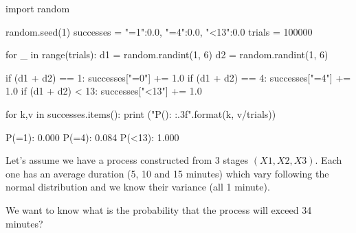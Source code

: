 \cprotEnv\begin{solution}
\begin{ipython}
import random

random.seed(1)
successes = {"=1":0.0, "=4":0.0, "<13":0.0}
trials = 100000

for _ in range(trials):
    d1 = random.randint(1, 6)
    d2 = random.randint(1, 6)

    if (d1 + d2) == 1:
        successes["=0"] += 1.0
    if (d1 + d2) == 4:
        successes["=4"] += 1.0
    if (d1 + d2) < 13:
        successes["<13"] += 1.0

for k,v in successes.items():
    print ("P({}): {:.3f}".format(k, v/trials))
\end{ipython}
\begin{ioutput}
P(=1): 0.000
P(=4): 0.084
P(<13): 1.000
\end{ioutput}
\end{solution}

\begin{question}
Let’s assume we have a process constructed from 3 stages $(X1, X2, X3)$. Each one has an average duration (5, 10 and 15 minutes) which vary following the normal distribution and we know their variance (all 1 minute).

We want to know what is the probability that the process will exceed 34 minutes?
\end{question}

